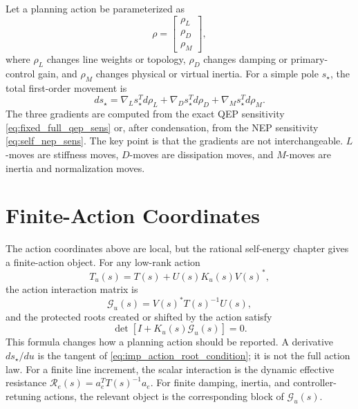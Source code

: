 Let a planning action be parameterized as
\begin{equation}
  \rho=
  \begin{bmatrix}
  \rho_L\\
  \rho_D\\
  \rho_M
  \end{bmatrix},
  \label{eq:action_vector}
\end{equation}
where \(\rho_L\) changes line weights or topology, \(\rho_D\) changes damping
or primary-control gain, and \(\rho_M\) changes physical or virtual inertia.
For a simple pole \(s_\star\), the total first-order movement is
\begin{equation}
  ds_\star
  =
  \nabla_Ls_\star^T d\rho_L
  +
  \nabla_Ds_\star^T d\rho_D
  +
  \nabla_Ms_\star^T d\rho_M.
  \label{eq:mixed_gradient}
\end{equation}
The three gradients are computed from the exact QEP sensitivity
\eqref{eq:fixed_full_qep_sens} or, after condensation, from the NEP
sensitivity \eqref{eq:self_nep_sens}. The key point is that the gradients are
not interchangeable. \(L\)-moves are stiffness moves, \(D\)-moves are
dissipation moves, and \(M\)-moves are inertia and normalization moves.

\section{Finite-Action Coordinates}

The action coordinates above are local, but the rational self-energy chapter
gives a finite-action object. For any low-rank action
\[
  T_u(s)=T(s)+U(s)K_u(s)V(s)^*,
\]
the action interaction matrix is
\begin{equation}
  \mathcal G_u(s)=V(s)^*T(s)^{-1}U(s),
  \label{eq:imp_action_green_matrix}
\end{equation}
and the protected roots created or shifted by the action satisfy
\begin{equation}
  \det\!\left[I+K_u(s)\mathcal G_u(s)\right]=0.
  \label{eq:imp_action_root_condition}
\end{equation}
This formula changes how a planning action should be reported. A derivative
\(ds_\star/du\) is the tangent of \eqref{eq:imp_action_root_condition}; it is
not the full action law. For a finite line increment, the scalar interaction is
the dynamic effective resistance
\(\mathcal R_e(s)=a_e^TT(s)^{-1}a_e\). For finite damping, inertia, and
controller-retuning actions, the relevant object is the corresponding block of
\(\mathcal G_u(s)\).

